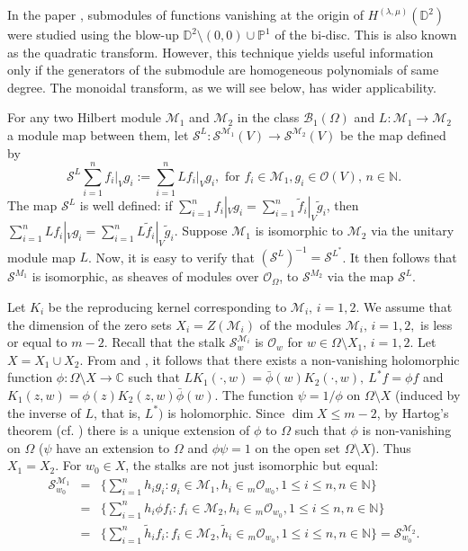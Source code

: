 \documentclass[11pt]{amsart}
\theoremstyle{definition}
\numberwithin{equation}{section}
\begin{document}
In the paper \cite{dmv}, submodules of functions vanishing at the origin of $H^{(\lambda, \mu)}(\mathbb D^2)$ were studied using the blow-up $\mathbb D^2 \setminus (0,0) \cup \mathbb P^1$ of the bi-disc.  This is also known as the quadratic transform.  However, this technique yields useful information only if the generators of the submodule are homogeneous polynomials of same degree. The monoidal transform, as we will see below, has wider applicability.

For any two Hilbert module  $\mathcal M_1$ and $\mathcal M_2$ in the class $\mathcal B_1(\Omega)$ and $L: \mathcal M_1{\rightarrow} \mathcal M_2$ a module map between them, let $\mathcal S^L: \mathcal S^{\mathcal M_1}(V){\rightarrow} \mathcal S^{\mathcal M_2}(V)$ be the map defined by
$$
\mathcal S^L{\sum_{i=1}^nf_i|_Vg_i}:=\sum_{i=1}^nLf_i|_Vg_i, \mbox{~for~} f_i\in\mathcal M_1, g_i\in\mathcal O(V),\,n\in\mathbb N.
$$
The map $\mathcal S^L$ is well defined: if  $\sum_{i=1}^nf_i|_Vg_i=\sum_{i=1}^n\tilde f_i|_V\tilde g_i$, then $\sum_{i=1}^nLf_i|_Vg_i=\sum_{i=1}^nL\tilde f_i|_V\tilde g_i$. Suppose $\mathcal M_1$ is isomorphic to $\mathcal M_2$ via the unitary module map $L$. Now, it is easy to verify that $(\mathcal S^{L})^{-1}=\mathcal S^{L^*}$.  It then follows that $\mathcal S^{M_1}$ is isomorphic, as sheaves of modules over $\mathcal O_{\Omega}$, to $\mathcal S^{M_2}$ via the map  $\mathcal S^{L}$.

Let $K_i$ be the reproducing kernel corresponding to $\mathcal M_i,\, i=1,2$. 
We assume that the dimension of the zero sets $X_i=Z(\mathcal M_i)$ of the modules $\mathcal M_i,\,i=1,2,$ is less or equal to $m-2$. Recall that the stalk $\mathcal S^{\mathcal M_i}_{w}$ is $\mathcal O_{w}$ for $w\in\Omega\setminus X_1,\,i=1,2$. Let $X=X_1\cup X_2$. From \cite[Lemma 1.3]{bmp} and \cite[Theorem 3.7]{cs}, it follows that there exists a non-vanishing holomorphic function $\phi:\Omega \setminus X {\rightarrow} {{\mathbb C}}$
such that $LK_1(\cdot,w)= \bar\phi(w)K_2(\cdot,w),~ L^*f=\phi f$ and $K_1(z,w) = \phi(z)K_2(z,w)\bar\phi(w)$.
The function $\psi=1/\phi$ on $\Omega\setminus X$ (induced by the inverse of $L$, that is, $L^*)$ is holomorphic. Since $\dim X\leq m-2$, by Hartog's theorem (cf. \cite[Page 198]{loj})
there is a unique extension of $\phi$ to $\Omega$ such that $\phi$ is non-vanishing on $\Omega$ ($\psi$ have an extension to $\Omega$ and $\phi\psi=1$ on the open set $\Omega\setminus X$). Thus $X_1=X_2$. For
$w_0\in X$,  the stalks are not just isomorphic but equal:
\begin{eqnarray*}\mathcal S^{\mathcal M_1}_{w_0}&=& \{{\sum}_{i=1}^nh_ig_i : g_i\in\mathcal M_1, h_i\in {_m\mathcal O_{w_0}},
1\leq i\leq n, n\in{\mathbb{N}}\}\\ &=& \{{\sum}_{i=1}^nh_i\phi f_i : f_i\in\mathcal M_2, h_i\in {_m\mathcal O_{w_0}}, 1\leq
i\leq n, n\in{\mathbb{N}}\}\\ &=& \{{\sum}_{i=1}^n\tilde h_if_i : f_i\in\mathcal M_2, \tilde h_i\in {_m\mathcal O_{w_0}},
1\leq i\leq n, n\in{\mathbb{N}}\}=\mathcal S^{\mathcal M_2}_{w_0}.\end{eqnarray*}
\end{document}
